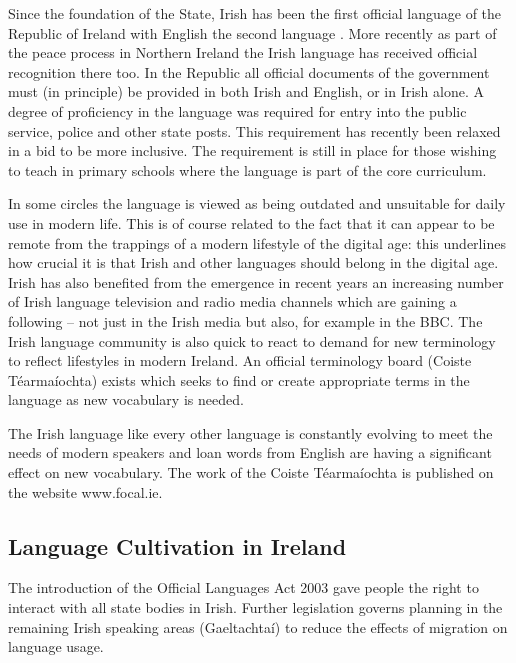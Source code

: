 \begin{multicols}{2}
Since the foundation of the State, Irish has been the first official language of the Republic of Ireland with English the second language \cite{oriagain97}. More recently as part of the peace process in Northern Ireland the Irish language has received official recognition there too. In the Republic all official documents of the government must (in principle) be provided in both Irish and English, or in Irish alone. A degree of proficiency in the language was required for entry into the public service, police and other state posts. This requirement has recently been relaxed in a bid to be more inclusive. The requirement is still in place for those wishing to teach in primary schools where the language is part of the core curriculum.

In some circles the language is viewed as being outdated and unsuitable for daily use in modern life. This is of course related to the fact that it can appear to be remote from the trappings of a modern lifestyle of the digital age: this underlines how crucial it is that Irish and other languages should belong in the digital age. Irish has also benefited from the emergence in recent years an increasing number of Irish language television and radio media channels which are gaining a following -- not just in the Irish media but also, for example in the BBC. The Irish language community is also quick to react to demand for new terminology to reflect lifestyles in modern Ireland. An official terminology board (Coiste Téarmaíochta) exists which seeks to find or create appropriate terms in the language as new vocabulary is needed.

The Irish language like every other language is constantly evolving to meet the needs of modern speakers and loan words from English are having a significant effect on new vocabulary. The work of the Coiste Téarmaíochta is published on the website www.focal.ie.




\subsection{Language Cultivation in Ireland}

The introduction of the Official Languages Act 2003 gave people the right to interact with all state bodies in Irish. Further legislation governs planning in the remaining Irish speaking areas (Gaeltachtaí) to reduce the effects of migration on language usage.


\end{multicols}
